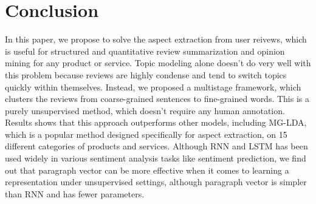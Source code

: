 \section{Conclusion}

In this paper, we propose to solve the aspect extraction from user reivews, 
which is useful for structured and quantitative review summarization and 
opinion mining for any product or service. Topic modeling alone doesn't do
very well with this problem because reviews are highly condense and tend to
switch topics quickly within themselves. Instead, we proposed a
multistage framework, which clusters the reviews from coarse-grained
sentences to fine-grained words. This is a purely unsupervised method, which
doesn't require any human annotation. Results shows that this approach
outperforms other models, including MG-LDA, which is a popular method
designed specifically for aspect extraction, on 15 different categories of
products and services. Although RNN and LSTM has been used widely in various 
sentiment analysis tasks like sentiment prediction, we find out that
paragraph vector can be more effective when it comes to learning a
representation under unsupervised settings, although paragraph vector
is simpler than RNN and has fewer parameters.

% 
